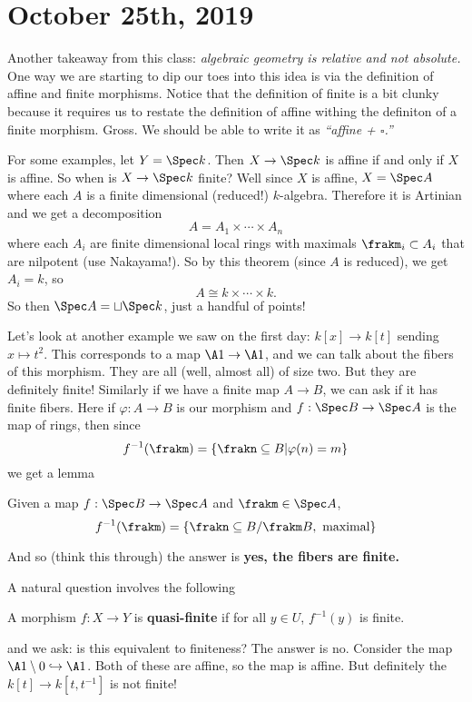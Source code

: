 \documentclass[12pt]{article}
\begin{document}
\section{October 25th, 2019}
Another takeaway from this class: \textit{algebraic geometry is relative and not absolute.} One way we are starting to dip our toes into this idea 
is via the definition of affine and finite morphisms. Notice that the definition of finite is a bit clunky because it requires us 
to restate the definition of affine withing the definiton of a finite morphism. Gross. We should be able to write it as \textit{``affine + $\square$.''}

For some examples, let $Y=\Spec k$. Then $X\to \Spec k$ is affine if and only if $X$ is affine. So when is $X\to\Spec k$ finite? Well since $X$ is affine, $X=\Spec A$ 
where each $A$ is a finite dimensional (reduced!) $k$-algebra. Therefore it is Artinian and we get a decomposition 
\[A=A_1\times\cdots\times A_n\]
where each $A_i$ are finite dimensional local rings with maximals $\frakm_i\subset A_i$ that are nilpotent (use Nakayama!). So by this theorem (since $A$ is reduced),
we get $A_i=k$, so 
\[A\cong k\times\cdots\times k.\]
So then $\Spec A=\sqcup \Spec k$, just a handful of points!

Let's look at another example we saw on the first day: $k[x]\to k[t]$ sending $x\mapsto t^2$. This corresponds to a map $\A1\to\A1$, 
and we can talk about the fibers of this morphism. They are all (well, almost all) of size two. But they are definitely finite! Similarly if 
we have a finite map $A\to B$, we can ask if it has finite fibers. Here if $\varphi:A\to B$ is our morphism and $f:\Spec B\to\Spec A$ is the map of rings,
then since
\[f^{-1}(\frakm)=\{\frakn\subseteq B|\varphi(n)=m\}\]
we get a lemma 
\begin{lem}
	Given a map $f:\Spec B\to \Spec A$ and $\frakm\in\Spec A$, 
	\[f^{-1}(\frakm)=\{\frakn\subseteq B/\frakm B,\text{ maximal}\}\]
\end{lem}
And so (think this through) the answer is \textbf{yes, the fibers are finite.}

A natural question involves the following 
\begin{defn}
	A morphism $f:X\to Y$ is \textbf{quasi-finite} if for all $y\in U$, $f^{-1}(y)$ is finite.
\end{defn}
and we ask: is this equivalent to finiteness? The answer is no. Consider the map $\A1\setminus 0\hookrightarrow\A1$. Both of these are affine, so the map is affine. 
But definitely the $k[t]\to k[t,t^{-1}]$ is not finite!
\end{document}
